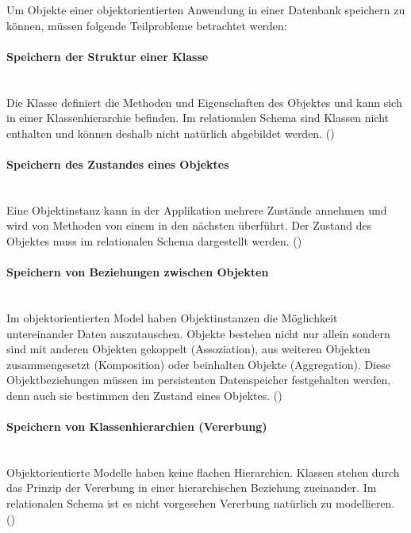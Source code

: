 Um Objekte einer objektorientierten Anwendung in einer Datenbank speichern zu können, müssen folgende Teilprobleme betrachtet werden:

\paragraph{Speichern der Struktur einer Klasse} \hspace{0pt} \\
Die Klasse definiert die Methoden und Eigenschaften des Objektes und kann sich in einer Klassenhierarchie befinden. Im relationalen Schema sind Klassen nicht enthalten und können deshalb nicht natürlich abgebildet werden. (\cite[S. 4]{Sche1})

\paragraph{Speichern des Zustandes eines Objektes} \hspace{0pt} \\
Eine Objektinstanz kann in der Applikation mehrere Zustände annehmen und wird von Methoden von einem in den nächsten überführt. Der Zustand des Objektes muss im relationalen Schema dargestellt werden. (\cite[S. 4]{Sche1})

\paragraph{Speichern von Beziehungen zwischen Objekten} \hspace{0pt} \\
Im objektorientierten Model haben Objektinstanzen die Möglichkeit untereinander Daten auszutauschen. Objekte bestehen nicht nur allein sondern sind mit anderen Objekten gekoppelt (Assoziation), aus weiteren Objekten zusammengesetzt (Komposition) oder beinhalten Objekte (Aggregation). Diese Objektbeziehungen müssen im persistenten Datenspeicher festgehalten werden, denn auch sie bestimmen den Zustand eines Objektes. (\cite[S. 4]{Sche1})

\paragraph{Speichern von Klassenhierarchien (Vererbung)} \hspace{0pt} \\
Objektorientierte Modelle haben keine flachen Hierarchien. Klassen stehen durch das Prinzip der Vererbung in einer hierarchischen Beziehung zueinander. Im relationalen Schema ist es nicht vorgesehen Vererbung natürlich zu modellieren. (\cite[S. 4]{Sche1})

